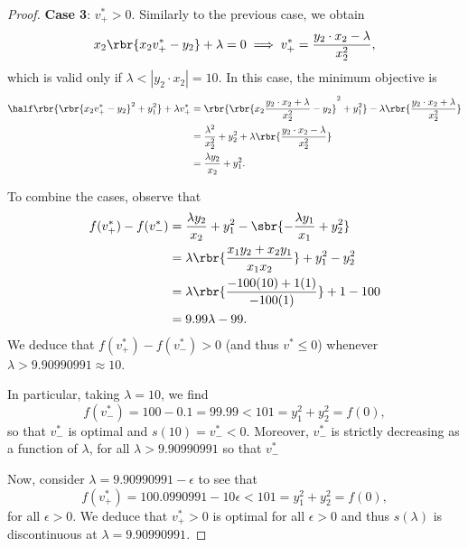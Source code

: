 \begin{proof}
	\textbf{Case 3}: \( v_{+}^* > 0 \).
	Similarly to the previous case, we obtain
	\[
		x_2 \rbr{x_2 v_{+}^* - y_2} + \lambda = 0 \implies v_{+}^* = \frac{y_2 \cdot x_2 - \lambda}{x_2^2},
	\]
	which is valid only if \( \lambda < |y_2 \cdot x_2| = 10 \).
	In this case, the minimum objective is
	\begin{align*}
		\half \rbr{\rbr{x_2 v_{+}^* - y_2}^2 + y_1^2} + \lambda v_{+}^*
		 & = \rbr{\rbr{x_2 \frac{y_2 \cdot x_2 + \lambda}{x_2^2} - y_2}^2 + y_1^2} - \lambda \rbr{\frac{y_2 \cdot x_2 + \lambda}{x_2^2}} \\
		 & = \frac{\lambda^2}{x_2^2} + y_2^2 + \lambda \rbr{\frac{y_2 \cdot x_2 - \lambda}{x_2^2}}                                       \\
		 & = \frac{\lambda y_2}{x_2} + y_1^2.
	\end{align*}

	To combine the cases, observe that
	\begin{align*}
		f(v_+^*) - f(v_-^*)
		 & = \frac{\lambda y_2}{x_2} + y_1^2 - \sbr{-\frac{\lambda y_1}{x_1} + y_2^2} \\
		 & = \lambda \rbr{\frac{x_1 y_2 + x_2 y_1}{x_1 x_2}} + y_1^2 - y_2^2          \\
		 & = \lambda \rbr{\frac{-100 (10) + 1 (1)}{-100 (1)}} + 1 - 100               \\
		 & = 9.99 \lambda - 99.
	\end{align*}
	We deduce that \( f(v_+^*) - f(v_-^*) > 0 \) (and thus \( v^* \leq 0 \))
	whenever \( \lambda > 9.90990991 \approx 10 \).

	In particular, taking \( \lambda = 10 \), we find
	\[
		f(v_-^*) = 100 - 0.1 = 99.99 < 101 = y_1^2 + y_2^2 = f(0),
	\]
	so that \( v_-^* \) is optimal and \( s(10) = v_-^* < 0 \).
	Moreover, \( v_-^* \) is strictly decreasing as a function of \( \lambda \),
	for all \( \lambda > 9.90990991 \)
	so that \( v_-^* \)

	Now, consider \( \lambda = 9.90990991 - \epsilon \) to see that
	\[
		f(v_+^*) = 100.0990991 - 10 \epsilon < 101 = y_1^2 + y_2^2 = f(0),
	\]
	for all \( \epsilon > 0 \).
	We deduce that \( v_+^* > 0 \) is optimal for all \( \epsilon > 0 \) and
	thus \( s(\lambda) \) is discontinuous at \( \lambda = 9.90990991 \).
\end{proof}

